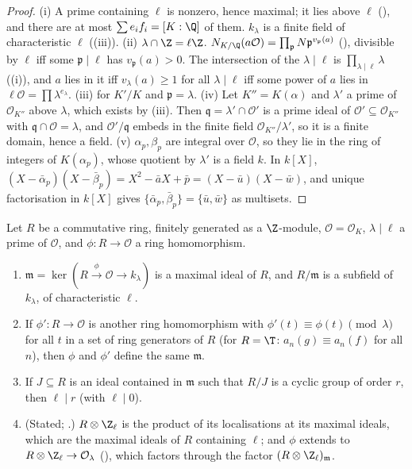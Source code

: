 \begin{proof}
(i) A prime containing $\ell$ is nonzero, hence maximal; it lies above $\ell$ (), and there are at most $\sum e_if_i=[K:\Q]$ of them.
$k_\lambda$ is a finite field of characteristic $\ell$ ((iii)). (ii) $\lambda\cap\Z=\ell\Z$. $N_{K/\Q}(a\mathcal O)=\prod_{\mathfrak p}N\mathfrak p^{v_{\mathfrak p}(a)}$
(), divisible by $\ell$ iff some $\mathfrak p\mid\ell$ has $v_{\mathfrak p}(a)>0$. The intersection of the $\lambda\mid\ell$ is
$\prod_{\lambda\mid\ell}\lambda$ ((i)), and $a$ lies in it iff $v_\lambda(a)\ge1$ for all $\lambda\mid\ell$ iff some power of $a$ lies in
$\ell\mathcal O=\prod\lambda^{e_\lambda}$. (iii)  for $K'/K$ and $\mathfrak p=\lambda$. (iv) Let $K''=K(\alpha)$ and $\lambda'$ a prime of $\mathcal O_{K''}$
above $\lambda$, which exists by (iii). Then $\mathfrak q=\lambda'\cap\mathcal O'$ is a prime ideal of $\mathcal O'\subseteq\mathcal O_{K''}$ with $\mathfrak q\cap\mathcal O=
\lambda$, and $\mathcal O'/\mathfrak q$ embeds in the finite field $\mathcal O_{K''}/\lambda'$, so it is a finite domain, hence a field. (v) $\alpha_p,\beta_p$ are
integral over $\mathcal O$, so they lie in the ring of integers of $K(\alpha_p)$, whose quotient by $\lambda'$ is a field $k$. In $k[X]$,
$(X-\bar\alpha_p)(X-\bar\beta_p)=X^2-\bar aX+\bar p=(X-\bar u)(X-\bar w)$, and unique factorisation in $k[X]$ gives $\{\bar\alpha_p,\bar\beta_p\}=\{\bar u,\bar w\}$ as
multisets.
\end{proof}

\begin{proposition}\label{prop:ant:congruencemaximal}
Let $R$ be a commutative ring, finitely generated as a $\Z$-module, $\mathcal O=\mathcal O_K$, $\lambda\mid\ell$ a prime of $\mathcal O$, and $\phi\colon R\to\mathcal O$ a
ring homomorphism.
\begin{enumerate}[label=(\roman*)]
\item $\mathfrak m=\ker(R\xrightarrow{\phi}\mathcal O\to k_\lambda)$ is a maximal ideal of $R$, and $R/\mathfrak m$ is a subfield of $k_\lambda$, of characteristic $\ell$.
\item If $\phi'\colon R\to\mathcal O$ is another ring homomorphism with $\phi'(t)\equiv\phi(t)\pmod\lambda$ for all $t$ in a set of ring generators of $R$ (for $R=\T$:
$a_n(g)\equiv a_n(f)$ for all $n$), then $\phi$ and $\phi'$ define the same $\mathfrak m$.
\item If $J\subseteq R$ is an ideal contained in $\mathfrak m$ such that $R/J$ is a cyclic group of order $r$, then $\ell\mid r$ (with $\ell\mid0$).
\item (Stated; .) $R\otimes\Z_\ell$ is the product of its localisations at its maximal ideals, which are the maximal ideals of $R$ containing $\ell$;
and $\phi$ extends to $R\otimes\Z_\ell\to\mathcal O_\lambda$ (), which factors through the factor $(R\otimes\Z_\ell)_{\mathfrak m}$.
\end{enumerate}
\end{proposition}

